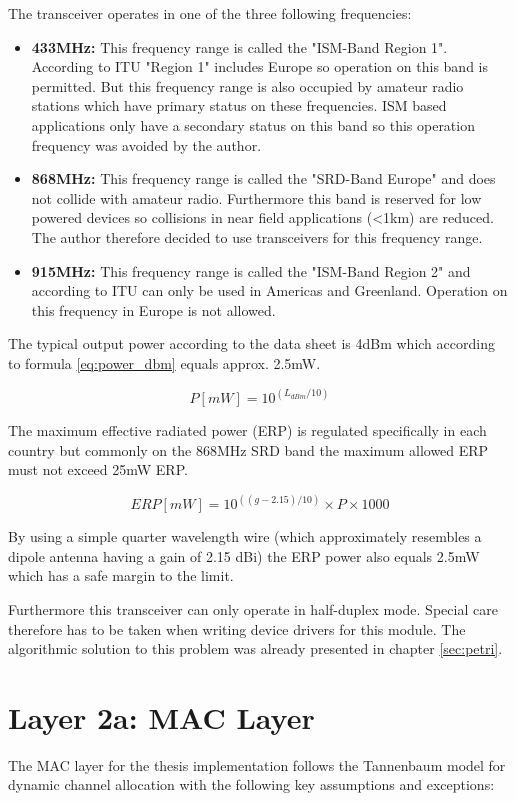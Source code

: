 The transceiver operates in one of the three following frequencies:
\begin{itemize}
\item \textbf{433MHz:} This frequency range is called the "ISM-Band Region 1". According to ITU "Region 1" includes Europe so operation on this band is permitted. But this frequency range is also occupied by amateur radio stations which have primary status on these frequencies. ISM based applications only have a secondary status on this band so this operation frequency was avoided by the author.
\item \textbf{868MHz:} This frequency range is called the "SRD-Band Europe" and does not collide with amateur radio. Furthermore this band is reserved for low powered devices so collisions in near field applications (<1km) are reduced. The author therefore decided to use transceivers for this frequency range.
\item \textbf{915MHz:} This frequency range is called the "ISM-Band Region 2" and according to ITU can only be used in Americas and Greenland. Operation on this frequency in Europe is not allowed.
\end{itemize}

The typical output power according to the data sheet is 4dBm which according to formula \ref{eq:power_dbm} equals approx. 2.5mW.

\begin{equation}
\label{eq:power_dbm}
P[mW] = 10^{(L_{dBm}/10)}
\end{equation}

The maximum effective radiated power (ERP) is regulated specifically in each country but commonly on the 868MHz SRD band the maximum allowed ERP must not exceed 25mW ERP.

\begin{equation}
ERP[mW] = 10^{((g-2.15)/10)} \times P \times 1000
\label{eq:power_dbm}
\end{equation}

By using a simple quarter wavelength wire (which approximately resembles a dipole antenna having a gain of 2.15 dBi) the ERP power also equals 2.5mW which has a safe margin to the limit.

Furthermore this transceiver can only operate in half-duplex mode. Special care therefore has to be taken when writing device drivers for this module. The algorithmic solution to this problem was already presented in chapter \ref{sec:petri}.

\section{Layer 2a: MAC Layer}
The MAC layer for the thesis implementation follows the Tannenbaum \cite{tannenbaum} model for dynamic channel allocation with the following key assumptions and exceptions:

